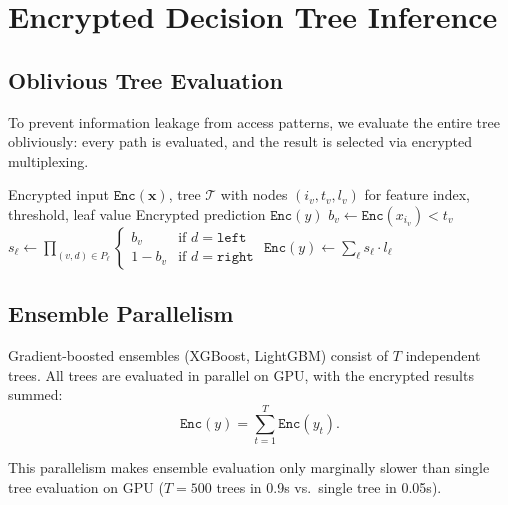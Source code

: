 \documentclass[11pt]{article}
\begin{document}
\section{Encrypted Decision Tree Inference}
\label{sec:tree}

\subsection{Oblivious Tree Evaluation}

To prevent information leakage from access patterns, we evaluate the entire
tree obliviously: every path is evaluated, and the result is selected via
encrypted multiplexing.

\begin{algorithm}
\caption{Oblivious Decision Tree Evaluation}
\label{alg:tree}
\begin{algorithmic}[1]
\Require Encrypted input $\texttt{Enc}(\mathbf{x})$, tree $\mathcal{T}$ with
    nodes $(i_v, t_v, l_v)$ for feature index, threshold, leaf value
\Ensure Encrypted prediction $\texttt{Enc}(y)$
    \State $b_v \leftarrow \texttt{Enc}(x_{i_v}) < t_v$ 
\EndFor
{}
    \State $s_\ell \leftarrow \prod_{(v, d) \in P_\ell}
    \begin{cases} b_v & \text{if } d = \texttt{left} \\
    1 - b_v & \text{if } d = \texttt{right} \end{cases}$
\EndFor
\State $\texttt{Enc}(y) \leftarrow \sum_\ell s_\ell \cdot l_\ell$
\end{algorithmic}
\end{algorithm}

\subsection{Ensemble Parallelism}

Gradient-boosted ensembles (XGBoost, LightGBM) consist of $T$ independent trees.
All trees are evaluated in parallel on GPU, with the encrypted results summed:
\begin{equation}
\texttt{Enc}(y) = \sum_{t=1}^{T} \texttt{Enc}(y_t).
\end{equation}

This parallelism makes ensemble evaluation only marginally slower than single
tree evaluation on GPU ($T = 500$ trees in 0.9s vs.\ single tree in 0.05s).
\end{document}
